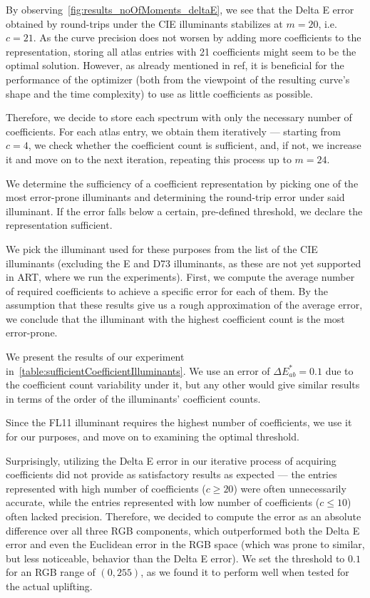 By observing~\cref{fig:results_noOfMoments_deltaE}, we see that the Delta E error obtained by round-trips under the CIE illuminants stabilizes at $m=20$, i.e. $c=21$. As the curve precision does not worsen by adding more coefficients to the representation, storing all atlas entries with 21 coefficients might seem to be the optimal solution. However, as already mentioned in ref, it is beneficial for the performance of the optimizer (both from the viewpoint of the resulting curve's shape and the time complexity) to use as little coefficients as possible.

Therefore, we decide to store each spectrum with only the necessary number of coefficients. For each atlas entry, we obtain them iteratively --- starting from $c=4$, we check whether the coefficient count is sufficient, and, if not, we increase it and move on to the next iteration, repeating this process up to $m=24$.

We determine the sufficiency of a coefficient representation by picking one of the most error-prone illuminants and determining the round-trip error under said illuminant. If the error falls below a certain, pre-defined threshold, we declare the representation sufficient.

We pick the illuminant used for these purposes from the list of the CIE illuminants (excluding the E and D73 illuminants, as these are not yet supported in ART, where we run the experiments). First, we compute the average number of required coefficients to achieve a specific error for each of them. By the assumption that these results give us a rough approximation of the average error, we conclude that the illuminant with the highest coefficient count is the most error-prone.

We present the results of our experiment in~\cref{table:sufficientCoefficientIlluminants}. We use an error of $\Delta E_{ab}^*=0.1$ due to the coefficient count variability under it, but any other would give similar results in terms of the order of the illuminants' coefficient counts.

Since the FL11 illuminant requires the highest number of coefficients, we use it for our purposes, and move on to examining the optimal threshold.

Surprisingly, utilizing the Delta E error in our iterative process of acquiring coefficients did not provide as satisfactory results as expected --- the entries represented with high number of coefficients ($c \ge 20$) were often unnecessarily accurate, while the entries represented with low number of coefficients ($c \le 10$) often lacked precision. Therefore, we decided to compute the error as an  absolute difference over all three RGB components, which outperformed both the Delta E error and even the Euclidean error in the RGB space (which was prone to similar, but less noticeable, behavior than the Delta E error). We set the threshold to $0.1$ for an RGB range of $(0,255)$, as we found it to perform well when tested for the actual uplifting. 

